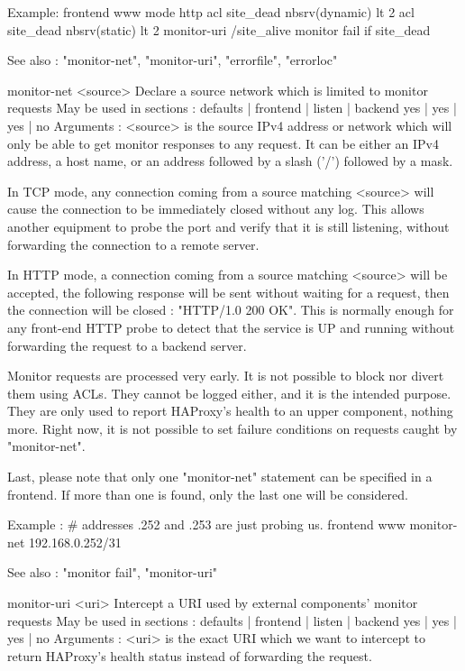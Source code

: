   Example:
     frontend www
        mode http
        acl site_dead nbsrv(dynamic) lt 2
        acl site_dead nbsrv(static)  lt 2
        monitor-uri   /site_alive
        monitor fail  if site_dead

  See also : "monitor-net", "monitor-uri", "errorfile", "errorloc"


monitor-net <source>
  Declare a source network which is limited to monitor requests
  May be used in sections :   defaults | frontend | listen | backend
                                 yes   |    yes   |   yes  |   no
  Arguments :
    <source>  is the source IPv4 address or network which will only be able to
              get monitor responses to any request. It can be either an IPv4
              address, a host name, or an address followed by a slash ('/')
              followed by a mask.

  In TCP mode, any connection coming from a source matching <source> will cause
  the connection to be immediately closed without any log. This allows another
  equipment to probe the port and verify that it is still listening, without
  forwarding the connection to a remote server.

  In HTTP mode, a connection coming from a source matching <source> will be
  accepted, the following response will be sent without waiting for a request,
  then the connection will be closed : "HTTP/1.0 200 OK". This is normally
  enough for any front-end HTTP probe to detect that the service is UP and
  running without forwarding the request to a backend server.

  Monitor requests are processed very early. It is not possible to block nor
  divert them using ACLs. They cannot be logged either, and it is the intended
  purpose. They are only used to report HAProxy's health to an upper component,
  nothing more. Right now, it is not possible to set failure conditions on
  requests caught by "monitor-net".

  Last, please note that only one "monitor-net" statement can be specified in
  a frontend. If more than one is found, only the last one will be considered.

  Example :
    # addresses .252 and .253 are just probing us.
    frontend www
        monitor-net 192.168.0.252/31

  See also : "monitor fail", "monitor-uri"


monitor-uri <uri>
  Intercept a URI used by external components' monitor requests
  May be used in sections :   defaults | frontend | listen | backend
                                 yes   |    yes   |   yes  |   no
  Arguments :
    <uri>     is the exact URI which we want to intercept to return HAProxy's
              health status instead of forwarding the request.

